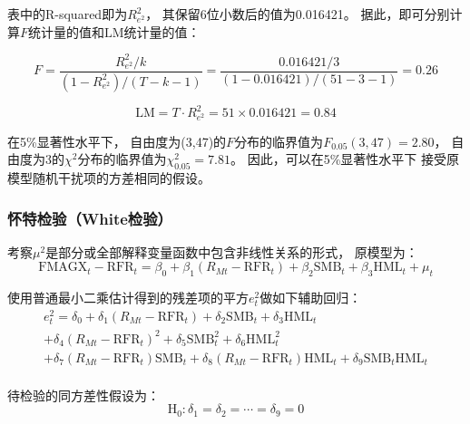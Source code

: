 \documentclass[UTF8]{ctexart}
\begin{document}
表中的R-squared即为$R_{e^2}^{2}$，
其保留6位小数后的值为0.016421。
据此，即可分别计算$F$统计量的值和$\mathrm{LM}$统计量的值：


\begin{equation}
  F=\frac{R_{e^2}^{2}/k}{\left( 1-R_{e^2}^{2} \right) /(T-k-1)}=\frac{0.016421/3}{\left( 1-0.016421 \right) /\left( 51-3-1 \right)}=0.26
\end{equation}

\begin{equation}
  \mathrm{LM}=T \cdot R_{e^{2}}^{2} = 51\times 0.016421 = 0.84
\end{equation}

在5\%显著性水平下，
自由度为(3,47)的$F$分布的临界值为$F_{0.05}(3,47)=2.80$，
自由度为3的$\chi^2$分布的临界值为$\chi^2_{0.05}=7.81$。
因此，可以在5\%显著性水平下
接受原模型随机干扰项的方差相同的假设。


\subsubsection{怀特检验（White检验）}

考察$\mu^2$是部分或全部解释变量函数中包含非线性关系的形式，
原模型为：
\begin{equation}
  \text{FMAGX}_t-\mathrm{RFR}_t=\beta_0+\beta_1\left( R_{Mt}-\mathrm{RFR}_t \right)+ \beta_2\mathrm{SMB}_t+\beta_3\mathrm{HML}_t + \mu_t
\end{equation}

使用普通最小二乘估计得到的残差项的平方$e_t^2$做如下辅助回归：
\begin{equation}
  \begin{array}{l}
    e_{t}^{2} = \delta _0+\delta _1\left( R_{Mt}-\mathrm{RFR}_t \right) +\delta _2\mathrm{SMB}_t+\delta _3\mathrm{HML}_t                                             \\
    +\delta _4\left( R_{Mt}-\mathrm{RFR}_t \right) ^2+\delta _5\mathrm{SMB}_{t}^{2}+\delta _6\mathrm{HML}_{t}^{2}                                                    \\
    +\delta _7\left( R_{Mt}-\mathrm{RFR}_t \right) \mathrm{SMB}_t+\delta _8\left( R_{Mt}-\mathrm{RFR}_t \right) \mathrm{HML}_t+\delta _9\mathrm{SMB}_t\mathrm{HML}_t \\
  \end{array}
\end{equation}

待检验的同方差性假设为：
\begin{equation}
  \mathrm{H_0}:\delta_1=\delta_2=\cdots=\delta_9=0
\end{equation}
\end{document}
